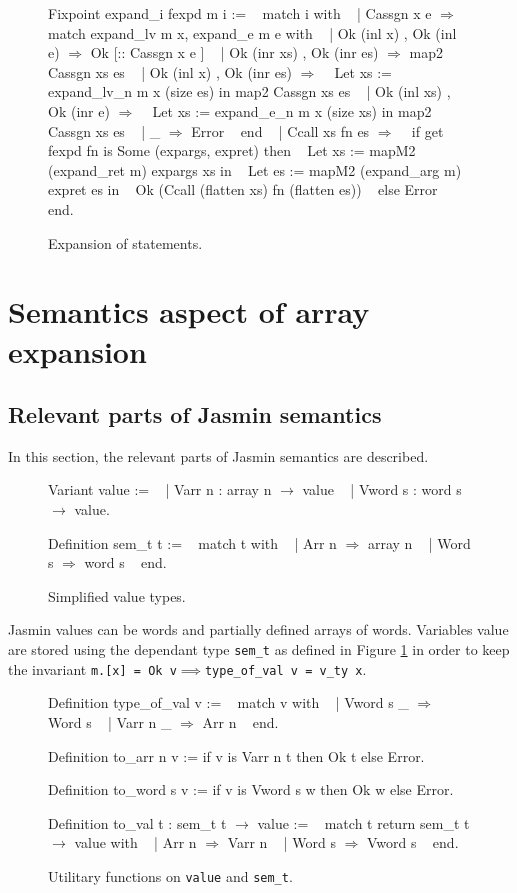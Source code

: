 \documentclass{article}
\begin{document}
\begin{figure}[t]
\obeylines\obeyspaces\ttfamily%
Fixpoint expand\_i fexpd m i :=
~ match i with
~ | Cassgn x e \(\Rightarrow\)
~   match expand\_lv m x, expand\_e m e     with
~   | Ok (inl x)       , Ok (inl e)       \(\Rightarrow\) Ok [:: Cassgn x e ]
~   | Ok (inr xs)      , Ok (inr es)      \(\Rightarrow\) map2 Cassgn xs es
~   | Ok (inl x)       , Ok (inr es)      \(\Rightarrow\)
~     Let xs := expand\_lv\_n m x (size es) in map2 Cassgn xs es
~   | Ok (inl xs)      , Ok (inr e)       \(\Rightarrow\)
~     Let xs := expand\_e\_n  m x (size xs) in map2 Cassgn xs es
~   | \_                                   \(\Rightarrow\) Error
~   end
~ | Ccall xs fn es \(\Rightarrow\)
~   if get fexpd fn is Some (expargs, expret) then
~     Let xs := mapM2 (expand\_ret m) expargs xs in
~     Let es := mapM2 (expand\_arg m) expret  es in
~     Ok (Ccall (flatten xs) fn (flatten es))
~   else Error
~ end.
\normalfont%
\caption{Expansion of statements.}
\end{figure}


\section{Semantics aspect of array expansion}\label{sec:semantics}

\subsection{Relevant parts of Jasmin semantics}

In this section, the relevant parts of Jasmin semantics are described.

\begin{figure}[t]
\obeylines\obeyspaces\ttfamily%
Variant value :=
~ | Varr  n : array n \(\rightarrow\) value
~ | Vword s : word  s \(\rightarrow\) value.

Definition sem\_t t :=
~ match t with
~ | Arr  n \(\Rightarrow\) array n
~ | Word s \(\Rightarrow\) word  s
~ end.
\normalfont%
\caption{Simplified value types.}\label{fig:val}
\end{figure}

Jasmin values can be words and partially defined arrays of words. Variables value
are stored using the dependant type \texttt{sem\_t} as defined in Figure
\ref{fig:val} in order to keep the invariant
\texttt{m.[x] = Ok v\(\implies\)type\_of\_val v = v\_ty x}.

\begin{figure}
\obeylines\obeyspaces\ttfamily%
Definition type\_of\_val v :=
~ match v with
~ | Vword s \_ \(\Rightarrow\) Word s
~ | Varr  n \_ \(\Rightarrow\) Arr  n
~ end.

Definition to\_arr  n v := if v is Varr  n t then Ok t else Error.

Definition to\_word s v := if v is Vword s w then Ok w else Error.

Definition to\_val t : sem\_t t \(\rightarrow\) value :=
~ match t return sem\_t t \(\rightarrow\) value with
~ | Arr  n \(\Rightarrow\) Varr  n
~ | Word s \(\Rightarrow\) Vword s
~ end.
\normalfont%
\caption{Utilitary functions on \texttt{value} and \texttt{sem\_t}.}
\end{figure}
\end{document}
